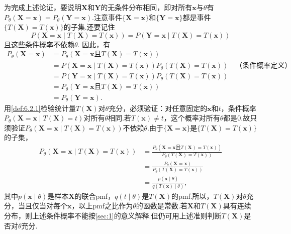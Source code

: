 为完成上述论证，要说明$\boldsymbol X$和$\boldsymbol Y$的无条件分布相同，即对所有$\boldsymbol x$与$\theta$有$P_\theta(\boldsymbol X=\boldsymbol x)=P_\theta(\boldsymbol Y=\boldsymbol x)$.注意事件$\{\boldsymbol X=\boldsymbol x\}$和$\{\boldsymbol Y=\boldsymbol x\}$都是事件$\{T(\boldsymbol X)=T(\boldsymbol x)\}$的子集.还要记住
$$P(\boldsymbol X=\boldsymbol x\mid T(\boldsymbol X)=T(\boldsymbol x))=P(\boldsymbol Y=\boldsymbol x\mid T(\boldsymbol X)=T(\boldsymbol x))$$
且这些条件概率不依赖$\theta$.
因此，有
\begin{align*}
P_\theta(\boldsymbol X=\boldsymbol x)&=P_\theta(\boldsymbol X=\boldsymbol x\text{且}T(\boldsymbol X)=T(\boldsymbol x))\\
&=P(\boldsymbol X=\boldsymbol x\mid T(\boldsymbol X)=T(\boldsymbol x))P_\theta(T(\boldsymbol X)=T(\boldsymbol x))\quad\text{（条件概率定义）}\\
&=P(\boldsymbol Y=\boldsymbol x\mid T(\boldsymbol X)=T(\boldsymbol x))P_\theta(T(\boldsymbol X)=T(\boldsymbol x))\\
&=P_\theta(\boldsymbol Y=\boldsymbol x\text{且}T(\boldsymbol X)=T(\boldsymbol x))\\
&=P_\theta(\boldsymbol Y=\boldsymbol x).
\end{align*}
用\autoref{def:6.2.1}检验统计量$T(\boldsymbol X)$对$\theta$充分，必须验证：对任意固定的$\boldsymbol x$和$t$，条件概率$P_\theta(\boldsymbol X=\boldsymbol x\mid T(\boldsymbol X)=t)$对所有$\theta$相同.若$T(\boldsymbol x)\ne t$，这个概率对所有$\theta$都是0.故只须验证$P_\theta(\boldsymbol X=\boldsymbol x\mid T(\boldsymbol X)=T(\boldsymbol x))$不依赖$\theta$.由于$\{\boldsymbol X=\boldsymbol x\}$是$\{T(\boldsymbol X)=T(\boldsymbol x)\}$的子集，
\begin{align*}
P_\theta(\boldsymbol X=\boldsymbol x\mid T(\boldsymbol X)=T(\boldsymbol x))
&=\frac{P_\theta(\boldsymbol X=\boldsymbol x\text{且}T(\boldsymbol X)=T(\boldsymbol x))}{P_\theta(T(\boldsymbol X)=T(\boldsymbol x))}\\
&=\frac{P_\theta(\boldsymbol X=\boldsymbol x)}{P_\theta(T(\boldsymbol X)=T(\boldsymbol x))}\\
&=\frac{p(\boldsymbol x\mid\theta)}{q(T(\boldsymbol x)\mid\theta)},
\end{align*}
其中$p(\boldsymbol x\mid\theta)$是样本$\boldsymbol X$的联合pmf，$q(t\mid\theta)$是$T(\boldsymbol X)$的pmf.所以，$T(\boldsymbol X)$对$\theta$充分，当且仅当对每个$\boldsymbol x$，以上pmf之比作为$\theta$的函数是常数.若$\boldsymbol X$和$T(\boldsymbol X)$具有连续分布，则上述条件概率不能按\autoref{sec:1}的意义解释.但仍可用上述准则判断$T(\boldsymbol X)$是否对$\theta$充分.
